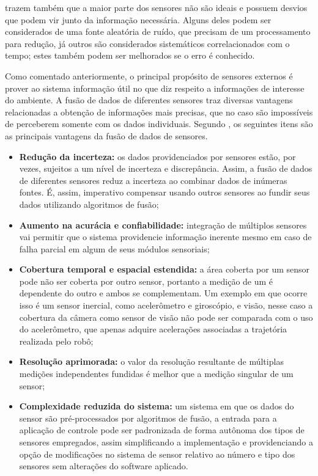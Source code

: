 \documentclass[acronym, symbols, table, deposito]{fei}
\begin{document}
			\textcite{fung2017sensor} trazem também que a maior parte dos sensores não são ideais e possuem desvios que podem vir junto da informação necessária. Alguns deles podem ser considerados de uma fonte aleatória de ruído, que precisam de um processamento para redução, já outros são considerados sistemáticos correlacionados com o tempo; estes também podem ser melhorados se o erro é conhecido.
			
			Como comentado anteriormente, o principal propósito de sensores externos é prover ao sistema informação útil no que diz respeito a informações de interesse do ambiente. A fusão de dados de diferentes sensores traz diversas vantagens relacionadas a obtenção de informações mais precisas, que no caso são impossíveis de perceberem somente com os dados individuais. Segundo \textcite{alatise2020review}, os seguintes itens são as principais vantagens da fusão de dados de sensores.
			
			\begin{itemize}
				
				\item \textbf{Redução da incerteza:} os dados providenciados por sensores estão, por vezes, sujeitos a um nível de incerteza e discrepância. Assim, a fusão de dados de diferentes sensores reduz a incerteza ao combinar dados de inúmeras fontes. É, assim, imperativo compensar usando outros sensores ao fundir seus dados utilizando algoritmos de fusão;
				
				\item \textbf{Aumento na acurácia e confiabilidade:} integração de múltiplos sensores vai permitir que o sistema providencie informação inerente mesmo em caso de falha parcial em algum de seus módulos sensoriais;
				
				\item \textbf{Cobertura temporal e espacial estendida:} a área coberta por um sensor pode não ser coberta por outro sensor, portanto a medição de um é dependente do outro e ambos se complementam. Um exemplo em que ocorre isso é um sensor inercial, como acelerômetro e giroscópio, e visão, nesse caso a cobertura da câmera como sensor de visão não pode ser comparada com o uso do acelerômetro, que apenas adquire acelerações associadas a trajetória realizada pelo robô;
				
				\item \textbf{Resolução aprimorada:} o valor da resolução resultante de múltiplas medições independentes fundidas é melhor que a medição singular de um sensor;
				
				\item \textbf{Complexidade reduzida do sistema:} um sistema em que os dados do sensor são pré-processados por algoritmos de fusão, a entrada para a aplicação de controle pode ser padronizada de forma autônoma dos tipos de sensores empregados, assim simplificando a implementação e providenciando a opção de modificações no sistema de sensor relativo ao número e tipo dos sensores sem alterações do software aplicado.
				
			\end{itemize}
		
\end{document}
